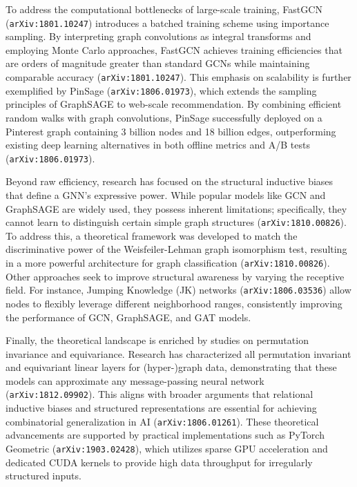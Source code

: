 \documentclass[11pt]{article}
\begin{document}
To address the computational bottlenecks of large-scale training, FastGCN (\texttt{arXiv:1801.10247}) introduces a batched training scheme using importance sampling. By interpreting graph convolutions as integral transforms and employing Monte Carlo approaches, FastGCN achieves training efficiencies that are orders of magnitude greater than standard GCNs while maintaining comparable accuracy (\texttt{arXiv:1801.10247}). This emphasis on scalability is further exemplified by PinSage (\texttt{arXiv:1806.01973}), which extends the sampling principles of GraphSAGE to web-scale recommendation. By combining efficient random walks with graph convolutions, PinSage successfully deployed on a Pinterest graph containing 3 billion nodes and 18 billion edges, outperforming existing deep learning alternatives in both offline metrics and A/B tests (\texttt{arXiv:1806.01973}).

Beyond raw efficiency, research has focused on the structural inductive biases that define a GNN's expressive power. While popular models like GCN and GraphSAGE are widely used, they possess inherent limitations; specifically, they cannot learn to distinguish certain simple graph structures (\texttt{arXiv:1810.00826}). To address this, a theoretical framework was developed to match the discriminative power of the Weisfeiler-Lehman graph isomorphism test, resulting in a more powerful architecture for graph classification (\texttt{arXiv:1810.00826}). Other approaches seek to improve structural awareness by varying the receptive field. For instance, Jumping Knowledge (JK) networks (\texttt{arXiv:1806.03536}) allow nodes to flexibly leverage different neighborhood ranges, consistently improving the performance of GCN, GraphSAGE, and GAT models.

Finally, the theoretical landscape is enriched by studies on permutation invariance and equivariance. Research has characterized all permutation invariant and equivariant linear layers for (hyper-)graph data, demonstrating that these models can approximate any message-passing neural network (\texttt{arXiv:1812.09902}). This aligns with broader arguments that relational inductive biases and structured representations are essential for achieving combinatorial generalization in AI (\texttt{arXiv:1806.01261}). These theoretical advancements are supported by practical implementations such as PyTorch Geometric (\texttt{arXiv:1903.02428}), which utilizes sparse GPU acceleration and dedicated CUDA kernels to provide high data throughput for irregularly structured inputs.
\end{document}
